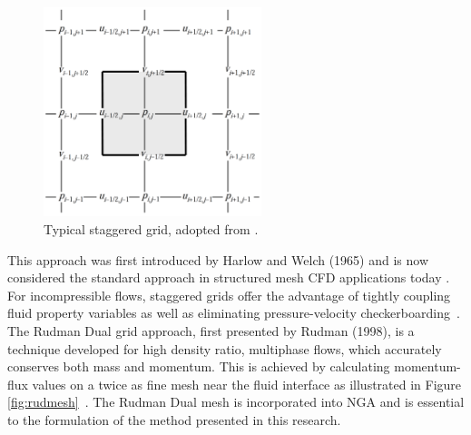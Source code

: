  \begin{figure}[h!]
 	\centering
 	\includegraphics[width=2.5in]{figs/StaggeredGrid}
 	\caption{Typical staggered grid, adopted from \cite{TRYG}.}
 	\label{fig:StagGrid}
 \end{figure}

\noindent This approach was first introduced by Harlow and Welch (1965) and is now considered the standard approach in structured mesh CFD applications today \cite{HARLOW1965}. For incompressible flows, staggered grids offer the advantage of tightly coupling fluid property variables as well as eliminating pressure-velocity checkerboarding~\cite{rudman}. The Rudman Dual grid approach, first presented by Rudman (1998), is a technique developed for high density ratio, multiphase flows, which accurately conserves both mass and momentum. This is achieved by calculating momentum-flux values on a twice as fine mesh near the fluid interface as illustrated in Figure \ref{fig:rudmesh}~\cite{Rudman}. The Rudman Dual mesh is incorporated into NGA and is essential to the formulation of the method presented in this research. 

